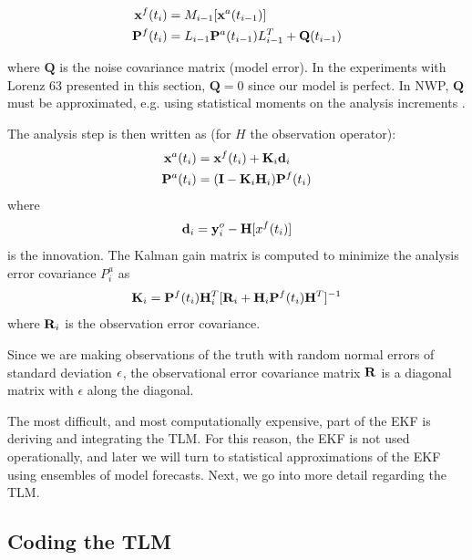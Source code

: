 \documentclass[12pt]{report}
\begin{document}
\begin{align*} \mathbf{x}^f (t_i) &= M _{i-1} [\mathbf{x} ^a (t_{i-1} ) ]\\
\mathbf{P}^f (t_i ) &= L_{i-1} \mathbf{P}^a (t_{i-1} ) L^T _{i-1} + \mathbf{Q} (t_{i-1} ) \end{align*}

where $\mathbf{Q}$ is the noise covariance matrix (model error).
In the experiments with Lorenz 63 presented in this section, $\mathbf{Q} = 0$ since our model is perfect.
In NWP, $\mathbf{Q}$ must be approximated, e.g. using statistical moments on the analysis increments .

The analysis step is then written as (for $H$ the observation operator):
\begin{align} \mathbf{x}^a (t_i ) &= \mathbf{x}^f (t_i) + \mathbf{K}_i \mathbf{d}_i\\
\mathbf{P}^a (t_i) &= (\mathbf{I} - \mathbf{K}_i \mathbf{H}_i )\mathbf{P}^f (t_i) \end{align}
where
\[ \mathbf{d}_i = \mathbf{y}_i^o - \mathbf{H}[x^f (t_i) ] \]
is the innovation. The Kalman gain matrix is computed to minimize the analysis error covariance $P^a _i$ as
\[ \mathbf{K}_i = \mathbf{P}^f (t_i) \mathbf{H}_i ^T [ \mathbf{R}_i + \mathbf{H}_i \mathbf{P}^f (t_i) \mathbf{H}^T ] ^{-1} \]
where $\mathbf{R}_i$ is the observation error covariance.

Since we are making observations of the truth with random normal errors of standard deviation $\mathbf{\epsilon}$, the observational error covariance matrix $\mathbf{R}$ is a diagonal matrix with $\epsilon$ along the diagonal.

The most difficult, and most computationally expensive, part of the EKF is deriving and integrating the TLM.
For this reason, the EKF is not used operationally, and later we will turn to statistical approximations of the EKF using ensembles of model forecasts.
Next, we go into more detail regarding the TLM.

\subsection{Coding the TLM}
\end{document}
